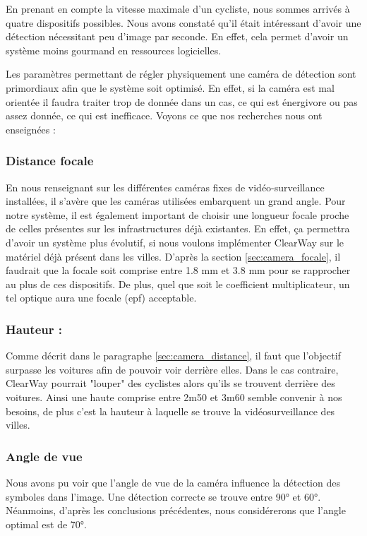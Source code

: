 En prenant en compte la vitesse maximale d'un cycliste, nous sommes arrivés à quatre dispositifs possibles. Nous avons constaté qu'il était intéressant
d'avoir une détection nécessitant peu d'image par seconde. En effet, cela permet d'avoir un système moins gourmand en ressources logicielles.

Les paramètres permettant de régler physiquement une caméra de détection sont primordiaux afin que le système soit optimisé.
En effet, si la caméra est mal orientée il faudra traiter trop de donnée dans un cas, ce qui est énergivore ou pas assez donnée, ce qui est inefficace.
Voyons ce que nos recherches nous ont enseignées :

\subsubsection*{Distance focale}
En nous renseignant sur les différentes caméras fixes de vidéo-surveillance installées, il s’avère que les caméras utilisées embarquent un grand angle.
Pour notre système, il est également important de choisir une longueur focale proche de celles présentes sur les infrastructures déjà existantes.
En effet, ça permettra d'avoir un système plus évolutif, si nous voulons implémenter ClearWay sur le matériel déjà présent dans les villes.
D'après la section \ref{sec:camera_focale}, il faudrait que la focale soit comprise entre 1.8 mm et 3.8 mm pour se rapprocher au plus de ces dispositifs.
De plus, quel que soit le coefficient multiplicateur, un tel optique aura une focale (\gls{epf}) acceptable.

\subsubsection*{Hauteur :}

Comme décrit dans le paragraphe \ref{sec:camera_distance}, il faut que l'objectif surpasse les voitures afin de pouvoir voir derrière elles.
Dans le cas contraire, ClearWay pourrait "louper" des cyclistes alors qu'ils se trouvent derrière des voitures.
Ainsi une haute comprise entre 2m50 et 3m60 semble convenir à nos besoins, de plus c'est la hauteur à laquelle se trouve la vidéosurveillance des villes.

\subsubsection*{Angle de vue}
Nous avons pu voir que l'angle de vue de la caméra influence la détection des symboles dans l'image. Une détection correcte se trouve entre 90° et 60°.
Néanmoins, d'après les conclusions précédentes, nous considérerons que l'angle optimal est de 70°.

